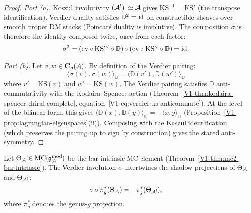 \begin{proof}
\emph{Part (a).}
Koszul involutivity
$(\mathcal{A}^!)^! \simeq \mathcal{A}$ gives $\mathrm{KS}^{-1} = \mathrm{KS}'$
(the transpose identification). Verdier duality satisfies
$\mathbb{D}^2 = \mathrm{id}$ on constructible sheaves over
smooth proper DM stacks (Poincar\'{e} duality is involutive).
The composition $\sigma$ is therefore the identity composed
twice, once from each factor:
\[
\sigma^2
= (\mathrm{ev} \circ \mathrm{KS}'^{\vee} \circ \mathbb{D})
 \circ
 (\mathrm{ev} \circ \mathrm{KS}^{\vee} \circ \mathbb{D})
= \mathrm{id}.
\]

\emph{Part (b).}
Let $v, w \in \mathbf{C}_g(\mathcal{A})$. By definition of the
Verdier pairing:
\[
\langle \sigma(v), \sigma(w) \rangle_{\mathbb{D}}
= \langle \mathbb{D}(v'), \mathbb{D}(w') \rangle_{\mathbb{D}}
\]
where $v' = \mathrm{KS}(v)$ and $w' = \mathrm{KS}(w)$.
The Verdier pairing satisfies $\mathbb{D}$ anti-commutativity
with the Kodaira--Spencer action
(Theorem~\ref{V1-thm:kodaira-spencer-chiral-complete},
equation~\eqref{V1-eq:verdier-ks-anticommute}). At the level of
the bilinear form, this gives
$\langle \mathbb{D}(x), \mathbb{D}(y) \rangle_{\mathbb{D}}
= -\langle x, y \rangle_{\mathbb{D}}$
(Proposition~\ref{V1-prop:lagrangian-eigenspaces}(ii)).
Composing with the Koszul identification (which preserves the
pairing up to sign by construction) gives the stated
anti-symmetry.
\end{proof}

\begin{proposition}
\label{prop:thqg-III-mc-compatibility}
Let $\Theta_{\mathcal{A}} \in \mathrm{MC}(\mathfrak{g}_{\mathcal{A}}^{\mathrm{mod}})$ be the
bar-intrinsic MC element
\textup{(}Theorem~\textup{\ref*{V1-thm:mc2-bar-intrinsic})}.
The Verdier involution $\sigma$ intertwines the shadow projections
of $\Theta_{\mathcal{A}}$ and $\Theta_{\mathcal{A}^!}$:
\begin{equation}%
\sigma \circ \pi_g^*(\Theta_\cA)
= -\pi_g^*(\Theta_{\cA^!}),
\end{equation}
where $\pi_g^*$ denotes the genus-$g$ projection.
\end{proposition}

